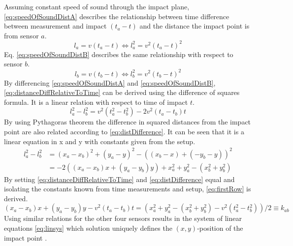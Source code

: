 	Assuming constant speed of sound through the impact plane, \eqref{eq:speedOfSoundDistA} describes the relationship between time difference between measurement and impact $(t_a - t)$ and the distance the impact point is from sensor $a$.
	\begin{equation}
		l_a = v(t_a - t) \Leftrightarrow l_a^2 = v^2(t_a - t)^2
		\label{eq:speedOfSoundDistA}
	\end{equation}
	Eq. \ref{eq:speedOfSoundDistB} describes the same relationship with respect to sensor $b$.
	\begin{equation}
		l_b = v(t_b - t) \Leftrightarrow l_b^2 = v^2(t_b - t)^2
	\label{eq:speedOfSoundDistB}
	\end{equation}
	By differencing \eqref{eq:speedOfSoundDistA} and \eqref{eq:speedOfSoundDistB}, \eqref{eq:distanceDiffRelativeToTime} can be derived using the difference of squares formula. It is a linear relation with respect to time of impact $t$.
	\begin{equation}
		l_a^2 - l_b^2 = v^2(t_a^2 - t_b^2) - 2 v^2 (t_a - t_b) t
		\label{eq:distanceDiffRelativeToTime}
	\end{equation}
	By using Pythagoras theorem the difference in squared distances from the impact point are also related according to \eqref{eq:distDifference}. It can be seen that it is a linear equation in x and y with constants given from the setup.
	\begin{equation}
		\begin{split}
			l_a^2 - l_b^2 & = (x_a - x_b)^2 + (y_a - y)^2 - ((x_b-x)+(-y_b - y))^2 \\
			& = -2( (x_a - x_b) x + (y_a - y_b) y ) + x_a^2 +y_a^2 -(x_b^2 + y_b^2)
		\end{split}
		\label{eq:distDifference}
	\end{equation}
	By setting \eqref{eq:distanceDiffRelativeToTime} and \eqref{eq:distDifference} equal and isolating the constants known from time measurements and setup, \eqref{eq:firstRow} is derived.
	\begin{equation}
		(x_a - x_b) x + (y_a - y_b) y - v^2(t_a - t_b) t = (x_a^2 +y_a^2 -(x_b^2 + y_b^2) - v^2(t_a^2 - t_b^2))/2 \equiv k_{ab}
		\label{eq:firstRow}
	\end{equation}
	Using similar relations for the other four sensors results in the system of linear equations \eqref{eq:linsys} which solution uniquely defines the $(x,y)$-position of the impact point \cite{tdoa_notes}.
